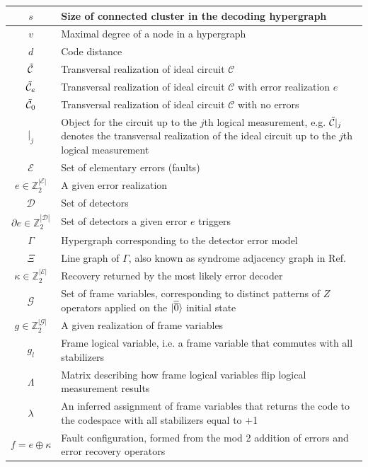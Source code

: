 \begin{table}
\begin{tabular}{|c|l|}
$s$ & Size of connected cluster in the decoding hypergraph\\\hline
$v$ & Maximal degree of a node in a hypergraph\\\hline
$d$ & Code distance\\\hline
$\tilde{\mathcal{C}}$ & Transversal realization of ideal circuit $\mathcal{C}$\\\hline
$\tilde{\mathcal{C}}_e$ & Transversal realization of ideal circuit $\mathcal{C}$ with error realization $e$\\\hline
$\tilde{\mathcal{C}}_0$ & Transversal realization of ideal circuit $\mathcal{C}$ with no errors\\\hline
$|_j$ & \makecell{Object for the circuit up to the $j$th logical measurement, e.g. $\tcal{C}|_j$ denotes\\ the transversal realization of the ideal circuit up to the $j$th logical measurement} \\\hline
$\mathcal{E}$ & Set of elementary errors (faults)\\\hline
$e\in \mathbb{Z}_2^{|\mathcal{E}|}$ & A given error realization\\\hline
$\mathcal{D}$ & Set of detectors \\\hline
$\partial e\in \mathbb{Z}_2^{|\mathcal{D}|}$ & Set of detectors a given error $e$ triggers\\\hline
$\Gamma$ & Hypergraph corresponding to the detector error model\\\hline
$\Xi$ & Line graph of $\Gamma$, also known as syndrome adjacency graph in Ref.~\cite{gottesman2013fault}\\\hline
$\kappa\in \mathbb{Z}_2^{|\mathcal{E}|}$ & Recovery returned by the most likely error decoder\\\hline
$\mathcal{G}$ & Set of frame variables, corresponding to distinct patterns of $Z$ operators applied on the $|\overline{\overline{0}}\rangle$ initial state \\\hline
$g\in \mathbb{Z}_2^{|\mathcal{G}|}$ & A given realization of frame variables \\\hline
$g_l$ & Frame logical variable, i.e. a frame variable that commutes with all stabilizers\\\hline
$\Lambda$ & Matrix describing how frame logical variables flip logical measurement results\\\hline
$\lambda$ & An inferred assignment of frame variables that returns the code to the codespace with all stabilizers equal to +1\\\hline
$f=e\oplus\kappa$ & Fault configuration, formed from the mod 2 addition of errors and error recovery operators\\\hline

\end{tabular}
\end{table}
